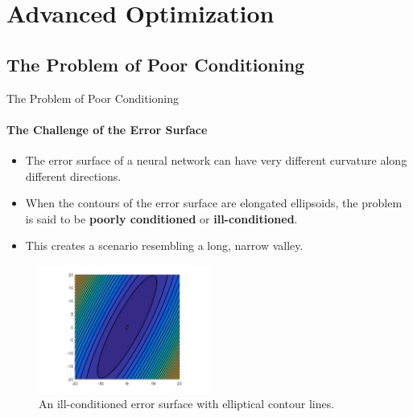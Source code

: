 \section{Advanced Optimization}

\subsection{The Problem of Poor Conditioning}

\begin{frame}{The Problem of Poor Conditioning}
    \framesubtitle{The Challenge of the Error Surface}
    \begin{itemize}
        \item The error surface of a neural network can have very different curvature along different directions.
        \item When the contours of the error surface are elongated ellipsoids, the problem is said to be \textbf{poorly conditioned} or \textbf{ill-conditioned}.
        \item This creates a scenario resembling a long, narrow valley.
    \end{itemize}
    \begin{figure}
        \includegraphics[width=0.5\textwidth]{images/elongated_ellipsoid.jpeg}
        \caption{An ill-conditioned error surface with elliptical contour lines.}
    \end{figure}
\end{frame}

